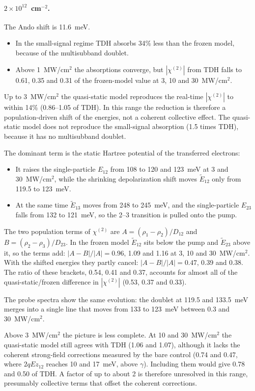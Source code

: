 \documentclass[11pt]{article}
\newcommand{\chitwo}{\chi^{(2)}}
\newcommand{\Et}{\tilde E}
\begin{document}
\paragraph{$2\times10^{12}$~cm$^{-2}$.} The Ando shift is 11.6~meV.
\begin{itemize}
\item In the small-signal regime TDH absorbs 34\% less than the frozen model, because of the multisubband doublet.
\item Above 1~MW/cm$^2$ the absorptions converge, but $|\chitwo|$ from TDH falls to 0.61, 0.35 and 0.31 of the frozen-model value at 3, 10 and 30~MW/cm$^2$.
\end{itemize}
Up to 3~MW/cm$^2$ the quasi-static model reproduces the real-time $|\chitwo|$ to within 14\% (0.86--1.05 of TDH). In this range the reduction is therefore a population-driven shift of the energies, not a coherent collective effect. The quasi-static model does not reproduce the small-signal absorption (1.5 times TDH), because it has no multisubband doublet.

The dominant term is the static Hartree potential of the transferred electrons:
\begin{itemize}
\item It raises the single-particle $E_{12}$ from 108 to 120 and 123~meV at 3 and 30~MW/cm$^2$, while the shrinking depolarization shift moves $\Et_{12}$ only from 119.5 to 123~meV.
\item At the same time $\Et_{13}$ moves from 248 to 245~meV, and the single-particle $E_{23}$ falls from 132 to 121~meV, so the 2--3 transition is pulled onto the pump.
\end{itemize}
The two population terms of $\chitwo$ are $A=(\rho_1-\rho_2)/D_{12}$ and $B=(\rho_2-\rho_3)/D_{23}$. In the frozen model $\Et_{12}$ sits below the pump and $\Et_{23}$ above it, so the terms add: $|A-B|/|A|=0.96$, 1.09 and 1.16 at 3, 10 and 30~MW/cm$^2$. With the shifted energies they partly cancel: $|A-B|/|A|=0.47$, 0.39 and 0.38. The ratio of these brackets, 0.54, 0.41 and 0.37, accounts for almost all of the quasi-static/frozen difference in $|\chitwo|$ (0.53, 0.37 and 0.33).

The probe spectra show the same evolution: the doublet at 119.5 and 133.5~meV merges into a single line that moves from 133 to 123~meV between 0.3 and 30~MW/cm$^2$.

Above 3~MW/cm$^2$ the picture is less complete. At 10 and 30~MW/cm$^2$ the quasi-static model still agrees with TDH (1.06 and 1.07), although it lacks the coherent strong-field corrections measured by the bare control (0.74 and 0.47, where $2qEz_{12}$ reaches 10 and 17~meV, above $\gamma$). Including them would give 0.78 and 0.50 of TDH. A factor of up to about 2 is therefore unresolved in this range, presumably collective terms that offset the coherent corrections.
\end{document}

